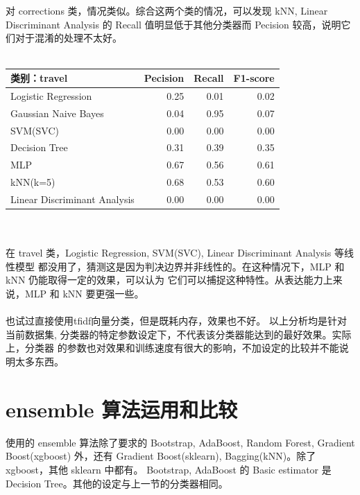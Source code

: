 \documentclass[12pt]{article}
\begin{document}
\\
\\
对 corrections 类，情况类似。综合这两个类的情况，可以发现 kNN, Linear Discriminant Analysis
的 Recall 值明显低于其他分类器而 Pecision 较高，说明它们对于混淆的处理不太好。
\\
\\
\begin{tabular}{l|r|r|r}
  \hline
  类别：\textbf{travel} &Pecision&Recall&F1-score\\
  \hline
  Logistic Regression& 0.25&0.01&0.02\\
  \hline
  Gaussian Naive Bayes&0.04&0.95&0.07\\
  \hline
  SVM(SVC)&0.00&0.00&0.00\\
  \hline
  Decision Tree&0.31&0.39&0.35\\
  \hline
  MLP&0.67&0.56&0.61\\
  \hline
  kNN(k=5)&0.68&0.53&0.60\\
  \hline
  Linear Discriminant Analysis&0.00&0.00&0.00\\
  \hline
\end{tabular}
\\
\\
在 travel 类，Logistic Regression, SVM(SVC), Linear Discriminant Analysis 等线性模型
都没用了，猜测这是因为判决边界并非线性的。在这种情况下，MLP 和 kNN 仍能取得一定的效果，可以认为
它们可以捕捉这种特性。从表达能力上来说，MLP 和 kNN 要更强一些。\\
\\
也试过直接使用tfidf向量分类，但是既耗内存，效果也不好。
以上分析均是针对当前数据集, 分类器的特定参数设定下，不代表该分类器能达到的最好效果。实际上，分类器
的参数也对效果和训练速度有很大的影响，不加设定的比较并不能说明太多东西。

\section{ensemble 算法运用和比较}
使用的 ensemble 算法除了要求的 Bootstrap, AdaBoost, Random Forest, Gradient Boost(xgboost)
外，还有 Gradient Boost(sklearn), Bagging(kNN)。除了 xgboost，其他 sklearn 中都有。
Bootstrap, AdaBoost 的 Basic estimator 是 Decision Tree。其他的设定与上一节的分类器相同。
\end{document}
